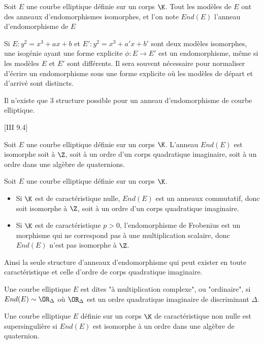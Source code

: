 \begin{Def}
	Soit $E$ une courbe elliptique définie sur un corps $\K$. Tout les modèles de $E$ ont des anneaux d'endomorphismes isomorphes, et l'on note $End(E)$ l'anneau d'endomorphisme de $E$
\end{Def}

\begin{Rem}
	Si $E : y^2 = x^3 + ax + b$ et $E' : y^2 = x^3 + a'x + b'$ sont deux modèles isomorphes, une isogénie ayant une forme explicite $\phi : E\rightarrow E'$ est un endomorphisme, même si les modèles $E$ et $E'$ sont différents. Il sera souvent nécessaire pour normaliser d'écrire un endomorphisme sous une forme explicite où les modèles de départ et d'arrivé sont distincts. 
\end{Rem}

Il n'existe que $3$ structure possible pour un anneau d'endomorphisme de courbe elliptique.

\begin{The}\cite{Sil09}[III 9.4]
	
	Soit $E$ une courbe elliptique définie sur un corps $\K$. L’anneau $End(E)$ est isomorphe soit à $\Z$, soit à un ordre d'un corps quadratique imaginaire, soit à un ordre dans une algèbre de quaternions.
\end{The}

\begin{Rem} Soit $E$ une courbe elliptique définie sur un corps $\K$.
	\begin{itemize}
		\item Si $\K$ est de caractéristique nulle, $End(E)$ est un anneaux commutatif, donc soit isomorphe à $\Z$, soit à un ordre d'un corps quadratique imaginaire.
		\item Si $\K$ est de caractéristique $p>0$, l'endomorphisme de Frobenius est un morphisme qui ne correspond pas à une multiplication scalaire, donc $End(E)$ n'est pas isomorphe à $\Z$.
	\end{itemize}
\end{Rem}

Ainsi la seule structure d'anneaux d'endomorphisme qui peut exister en toute caractéristique et celle d'ordre de corps quadratique imaginaire.  

\begin{Def}
	Une courbe elliptique $E$ est dites "à multiplication complexe", ou "ordinaire", si $End(E)\sim \OR_{\Delta}$ où $\OR_{\Delta}$ est un ordre quadratique imaginaire de discriminant $\Delta$. 
\end{Def}

\begin{Def}
	Une courbe elliptique $E$ définie sur un corps $\K$ de caractéristique non nulle est supersingulière si $End(E)$ est isomorphe à un ordre dans une algèbre de quaternion.  
\end{Def}